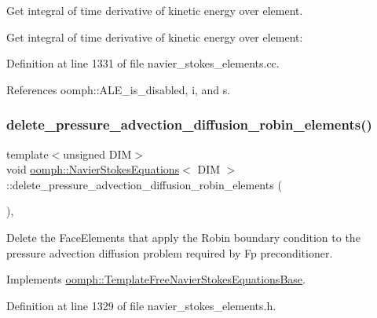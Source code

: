Get integral of time derivative of kinetic energy over element. 

Get integral of time derivative of kinetic energy over element\+: 

Definition at line 1331 of file navier\+\_\+stokes\+\_\+elements.\+cc.



References oomph\+::\+A\+L\+E\+\_\+is\+\_\+disabled, i, and s.

\mbox{\label{classoomph_1_1NavierStokesEquations_aae9c4d4a523e3f0c9280df798ec606a9}} 
\subsubsection{\texorpdfstring{delete\+\_\+pressure\+\_\+advection\+\_\+diffusion\+\_\+robin\+\_\+elements()}{delete\_pressure\_advection\_diffusion\_robin\_elements()}}
{\footnotesize\ttfamily template$<$unsigned D\+IM$>$ \\
void \hyperlink{classoomph_1_1NavierStokesEquations}{oomph\+::\+Navier\+Stokes\+Equations}$<$ D\+IM $>$\+::delete\+\_\+pressure\+\_\+advection\+\_\+diffusion\+\_\+robin\+\_\+elements (\begin{DoxyParamCaption}{ }\end{DoxyParamCaption})\hspace{0.3cm}{\ttfamily [inline]}, {\ttfamily [virtual]}}



Delete the Face\+Elements that apply the Robin boundary condition to the pressure advection diffusion problem required by Fp preconditioner. 



Implements \hyperlink{classoomph_1_1TemplateFreeNavierStokesEquationsBase_ac0505918d7458688c9cf55d348c92120}{oomph\+::\+Template\+Free\+Navier\+Stokes\+Equations\+Base}.



Definition at line 1329 of file navier\+\_\+stokes\+\_\+elements.\+h.



